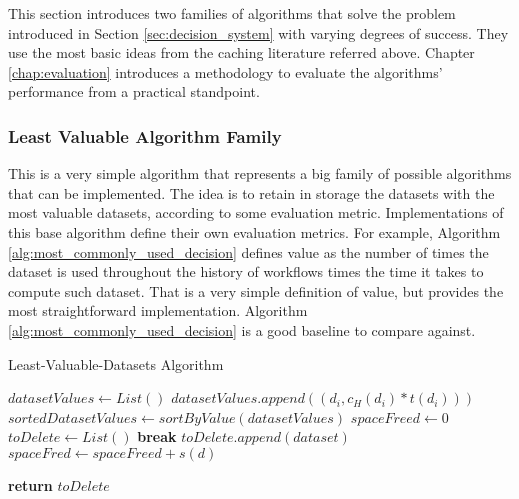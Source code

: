 This section introduces two families of algorithms that solve the problem introduced in Section \ref{sec:decision_system} with varying degrees of success. They use the most basic ideas from the caching literature referred above. Chapter \ref{chap:evaluation} introduces a methodology to evaluate the algorithms' performance from a practical standpoint.

\subsubsection{Least Valuable Algorithm Family}
This is a very simple algorithm that represents a big family of possible algorithms that can be implemented.  The idea is to retain in storage the datasets with the most valuable datasets, according to some evaluation metric. Implementations of this base algorithm define their own evaluation metrics.  For example, Algorithm \ref{alg:most_commonly_used_decision} defines value as the number of times the dataset is used throughout the history of workflows times the time it takes to compute such dataset. That is a very simple definition of value, but provides the most straightforward implementation.  Algorithm \ref{alg:most_commonly_used_decision} is a good baseline to compare against.

\begin{algorithm}
\begin{singlespace}
\caption{Least-Valuable-Datasets Algorithm}
\label{alg:most_commonly_used_decision}
\begin{algorithmic}[1]
	\State $datasetValues \gets List()$
		\State $datasetValues.append((d_i, c_H(d_i) * t(d_i)))$
	\EndFor
	\State $sortedDatasetValues \gets sortByValue(datasetValues)$
	\State $spaceFreed \gets 0$
	\State $toDelete \gets List()$
			\State \textbf{break}
		\EndIf	
		\State $toDelete.append(dataset)$
		\State $spaceFred \gets spaceFreed + s(d)$
	\EndFor
	
	\State \textbf{return} $toDelete$
\EndProcedure
\end{algorithmic}
\end{singlespace}
\end{algorithm}


